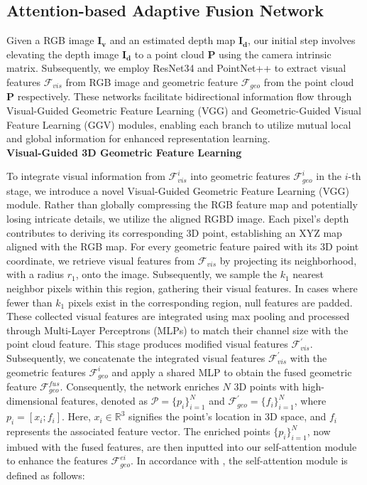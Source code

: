\subsection{Attention-based Adaptive Fusion Network}

Given a RGB image $\mathbf{I_v}$ and an estimated depth map $\mathbf{I_d}$, our initial step involves elevating the depth image $\mathbf{I_d}$ to a point cloud $\mathbf{P}$ using the camera intrinsic matrix. Subsequently, we employ ResNet34 \cite{he2016deep} and PointNet++ \cite{qi2017pointnet++} to extract visual features $\mathcal{F}_{vis}$ from RGB image and geometric feature $\mathcal{F}_{geo}$ from the point cloud $\mathbf{P}$ respectively. These networks facilitate bidirectional information flow through Visual-Guided Geometric Feature Learning (VGG) and Geometric-Guided Visual Feature Learning (GGV) modules, enabling each branch to utilize mutual local and global information for enhanced representation learning. \\

\textbf{Visual-Guided 3D Geometric Feature Learning}

To integrate visual information from $\mathcal{F}_{vis}^{i}$ into geometric features $\mathcal{F}_{geo}^{i}$ in the $i$-th stage, we introduce a novel Visual-Guided Geometric Feature Learning (VGG) module. Rather than globally compressing the RGB feature map and potentially losing intricate details, we utilize the aligned RGBD image. Each pixel's depth contributes to deriving its corresponding 3D point, establishing an XYZ map aligned with the RGB map. For every geometric feature paired with its 3D point coordinate, we retrieve visual features from $\mathcal{F}_{vis}$ by projecting its neighborhood, with a radius $r_1$, onto the image. Subsequently, we sample the $k_1$ nearest neighbor pixels within this region, gathering their visual features. In cases where fewer than $k_1$ pixels exist in the corresponding region, null features are padded. These collected visual features are integrated using max pooling and processed through Multi-Layer Perceptrons (MLPs) to match their channel size with the point cloud feature. This stage produces modified visual features $\mathcal{F}_{vis}^{'}$. Subsequently, we concatenate the integrated visual features $\mathcal{F}_{vis}^{'}$ with the geometric features $\mathcal{F}_{geo}^{i}$ and apply a shared MLP to obtain the fused geometric feature $\mathcal{F}_{geo}^{fus}$. Consequently, the network enriches $N$ 3D points with high-dimensional features, denoted as $\mathcal{P} = \lbrace p_i \rbrace_{i=1}^{N}$ and $\mathcal{F}_{geo}^{'} = \lbrace f_i \rbrace_{i=1}^{N}$, where $p_i = [ x_i; f_i ]$. Here, $x_i \in \mathbb{R}^{3}$ signifies the point's location in 3D space, and $f_i$ represents the associated feature vector. The enriched points $\lbrace p_{i} \rbrace_{i=1}^{N}$, now imbued with the fused features, are then inputted into our self-attention module to enhance the features $\mathcal{F}_{geo}^{ei}$. In accordance with \cite{zhao2021point, vaswani2017attention}, the self-attention module is defined as follows:


